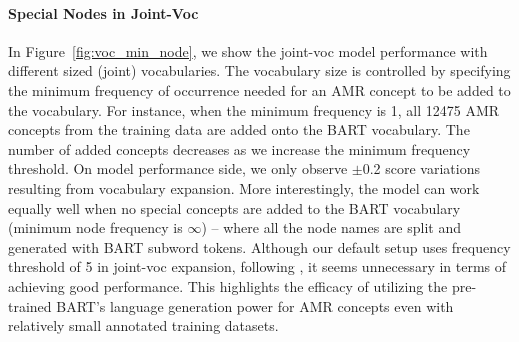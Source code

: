 \begin{table}[!t]
    \centering
     \caption{Effects of pre-trained BART parameters. Results are with our sep-voc model on AMR 2.0 data. $^*$ failed to converge with a range of hyper-parameters.}
    \label{tab:bart_components}
\end{table}


\paragraph{Special Nodes in Joint-Voc}

In Figure~\ref{fig:voc_min_node},
we show the joint-voc model performance with different sized (joint) vocabularies. The vocabulary size is controlled by specifying the minimum frequency of occurrence needed for an AMR concept to be added to the vocabulary.
For instance, when the minimum frequency is 1, all 12475 AMR concepts from the training data are added onto the BART vocabulary. The number of added concepts decreases as we increase the minimum  frequency threshold. On model performance side, we only observe $\pm$0.2 score variations resulting from vocabulary expansion. More interestingly, the model can work equally well when no special concepts are added to the BART vocabulary (minimum node frequency is $\infty$) -- where all the node names are split and generated with BART subword tokens.
Although our default setup uses frequency threshold of 5 in joint-voc expansion, following \citet{bevilacqua2021one}, it seems unnecessary in terms of achieving good performance.
This highlights the efficacy of utilizing the pre-trained BART's language generation power for AMR concepts even with relatively small annotated training datasets.



